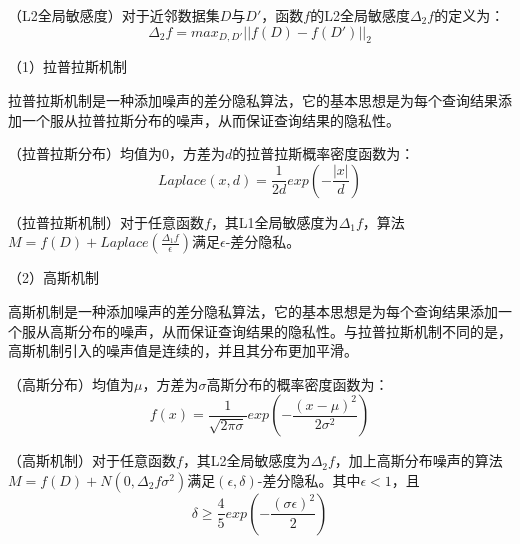 \begin{definition}
	（L2全局敏感度\cite{Algorithmic_Foundations_of_DP}）对于近邻数据集$D$与$D'$，函数$f$的L2全局敏感度$\Delta_2f$的定义为：
	\begin{equation}
		\Delta_2f=max_{D,D'}||f(D)-f(D')||_2
	\end{equation}
\end{definition}


（1）拉普拉斯机制

拉普拉斯机制是一种添加噪声的差分隐私算法，它的基本思想是为每个查询结果添加一个服从拉普拉斯分布的噪声，从而保证查询结果的隐私性。

%
%

\begin{definition}
	（拉普拉斯分布）均值为0，方差为$d$的拉普拉斯概率密度函数为：
	\begin{equation}
		Laplace(x, d)=\frac{1}{2d}exp(-\frac{|x|}{d})
	\end{equation}
\end{definition}

\begin{theorem}
	（拉普拉斯机制\cite{dwork2006calibrating}）对于任意函数$f$，其L1全局敏感度为$\Delta_1f$，算法$M=f(D)+Laplace(\frac{\Delta_1f}{\epsilon})$满足$\epsilon$-差分隐私。
\end{theorem}

（2）高斯机制

高斯机制是一种添加噪声的差分隐私算法，它的基本思想是为每个查询结果添加一个服从高斯分布的噪声，从而保证查询结果的隐私性。与拉普拉斯机制不同的是，高斯机制引入的噪声值是连续的，并且其分布更加平滑。

\begin{definition}
	（高斯分布）均值为$\mu$，方差为$\sigma$高斯分布的概率密度函数为：
	\begin{equation}
		f(x)=\frac{1}{\sqrt{2\pi\sigma}}exp(-\frac{(x-\mu)^2}{2\sigma^2})
	\end{equation}
\end{definition}

\begin{theorem}
	（高斯机制\cite{Algorithmic_Foundations_of_DP}）对于任意函数$f$，其L2全局敏感度为$\Delta_2f$，加上高斯分布噪声的算法$M=f(D)+N(0,\Delta_2f\sigma^2)$满足$(\epsilon, \delta)$-差分隐私。其中$\epsilon<1$，且
	$$\delta\geq \frac{4}{5}exp(-\frac{(\sigma\epsilon)^2}{2})$$
\end{theorem}

